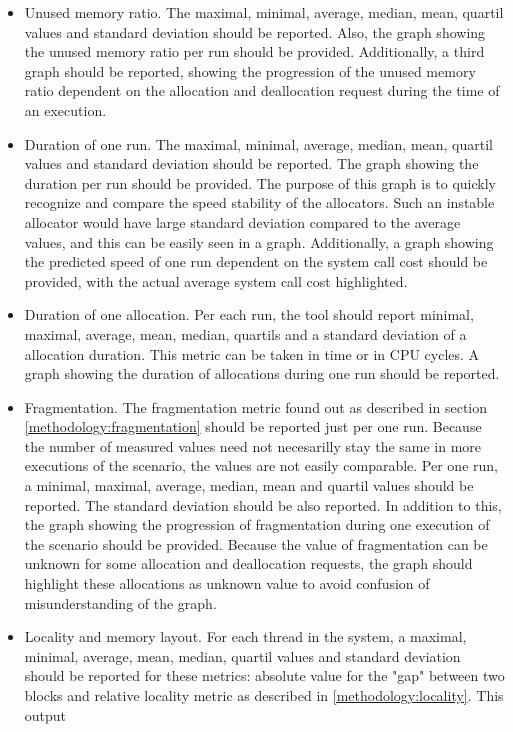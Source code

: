 \begin{itemize}
\item Unused memory ratio. The maximal, minimal, average, median, mean, quartil
values and standard deviation should be reported. Also, the graph showing the
unused memory ratio per run should be provided. Additionally, a third graph
should be reported, showing the progression of the unused memory ratio dependent
on the allocation and deallocation request during the time of an execution.
\item Duration of one run. The maximal, minimal, average, median, mean, quartil
values and standard deviation should be reported. The graph showing the duration
per run should be provided. The purpose of this graph is to quickly recognize and
compare the speed stability of the allocators. Such an instable allocator would
have large standard deviation compared to the average values, and this can be
easily seen in a graph. Additionally, a graph showing the predicted speed of one
run dependent on the system call cost should be provided, with the actual average
system call cost highlighted. \item Duration of one allocation. Per each run, the
tool should report minimal, maximal, average, mean, median, quartils and a
standard deviation of a allocation duration. This metric can be taken in time or
in CPU cycles. A graph showing the duration of allocations during one run should
be reported. \item Fragmentation. The fragmentation metric found out as described
in section \ref{methodology:fragmentation} should be reported just per one run.
Because the number of measured values need not necesarilly stay the same in more
executions of the scenario, the values are not easily comparable. Per one run, a
minimal, maximal, average, median, mean and quartil values should be reported.
The standard deviation should be also reported. In addition to this, the graph
showing the progression of fragmentation during one execution of the scenario
should be provided. Because the value of fragmentation can be unknown for some
allocation and deallocation requests, the graph should highlight these
allocations as unknown value to avoid confusion of misunderstanding of the graph.
\item Locality and memory layout. For each thread in the system, a maximal,
minimal, average, mean, median, quartil values and standard deviation should be
reported for these metrics: absolute value for the "gap" between two blocks and
relative locality metric as described in \ref{methodology:locality}. This output

\end{itemize}
